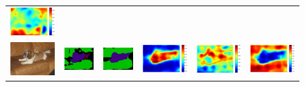 \begin{figure}
{\begin{tabular}{c c c c c c}
   \includegraphics[height=0.1\linewidth]{fig/voc12/att3/2011_002121.pdf} \\
   \includegraphics[height=0.1\linewidth]{fig/voc12/img/2007_008260.jpg} &
   \includegraphics[height=0.1\linewidth]{fig/voc12/res_baseline/2007_008260.png} &
   \includegraphics[height=0.1\linewidth]{fig/voc12/res_sharenet/2007_008260.png} &
   \includegraphics[height=0.1\linewidth]{fig/voc12/att1/2007_008260.pdf} &
   \includegraphics[height=0.1\linewidth]{fig/voc12/att2/2007_008260.pdf} &
   \includegraphics[height=0.1\linewidth]{fig/voc12/att3/2007_008260.pdf} \\

\end{tabular}}
\end{figure}
